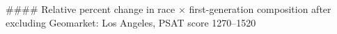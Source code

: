 #### Relative percent change in race × first-generation composition after excluding Geomarket: Los Angeles, PSAT score 1270–1520
